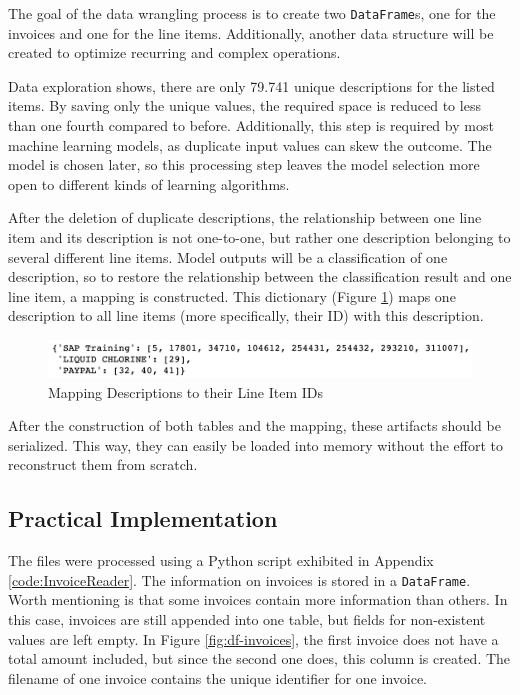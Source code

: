 	The goal of the data wrangling process is to create two \lstinline|DataFrame|s, one for the invoices and one for the line items.
	Additionally, another data structure will be created to optimize recurring and complex operations.
	
	Data exploration shows, there are only 79.741 unique descriptions for the listed items. By saving only the unique values, the required space is reduced to less than one fourth compared to before. Additionally, this step is required by most machine learning models, as duplicate input values can skew the outcome. The model is chosen later, so this processing step leaves the model selection more open to different kinds of learning algorithms.
	
	After the deletion of duplicate descriptions, the relationship between one line item and its description is not one-to-one, but rather one description belonging to several different line items. Model outputs will be a classification of one description, so to restore the relationship between the classification result and one line item, a mapping is constructed.
	This dictionary (Figure \ref{fig:mapping}) maps one description to all line items (more specifically, their ID) with this description.
	\begin{figure}[ht]
		\centering
		\includegraphics[width=\linewidth]{Bilder/description_map.png}
		\caption{Mapping Descriptions to their Line Item IDs}
		\label{fig:mapping}
	\end{figure}


	After the construction of both tables and the mapping, these artifacts should be serialized. This way, they can easily be loaded into memory without the effort to reconstruct them from scratch.
	
    \subsection{Practical Implementation}
	
	The files were processed using a Python script exhibited in Appendix \ref{code:InvoiceReader}. The information on invoices is stored in a  \lstinline|DataFrame|. Worth mentioning is that some invoices contain more information than others. In this case, invoices are still appended into one table, but fields for non-existent values are left empty. In Figure \ref{fig:df-invoices}, the first invoice does not have a total amount included, but since the second one does, this column is created.
	The filename of one invoice contains the unique identifier for one invoice.
	
